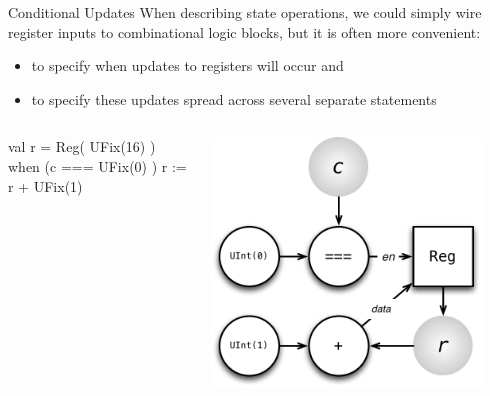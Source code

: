 \documentclass[xcolor=pdflatex,dvipsnames,table]{beamer}
\begin{document}
\begin{frame}[fragile]{Conditional Updates}
When describing state operations, we could simply wire register inputs to combinational logic blocks, but it is often more convenient:
\begin{itemize}
\item to specify when updates to registers will occur and
\item to specify these updates spread across several separate statements
\end{itemize}

\begin{columns}
\begin{scala}
val r = Reg( UFix(16) )
when (c === UFix(0) ) {
  r := r + UFix(1)
}
\end{scala}


\begin{center}
\includegraphics[width=0.9\textwidth]{figs/conditional-increment.pdf} 
\end{center}

\end{columns}
\end{frame}
\end{document}
